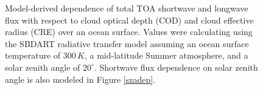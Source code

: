 \documentclass[12pt]{article}
\begin{document}
    \begin{figure}[h!]\label{flux-interp}
        \centering
        \begin{center}
        \end{center}
        \caption{Model-derived dependence of total TOA shortwave and longwave flux with respect to cloud optical depth (COD) and cloud effective radius (CRE) over an ocean surface. Values were calculating using the SBDART radiative transfer model assuming an ocean surface temperature of $300\,\si{K}$, a mid-latitude Summer atmosphere, and a solar zenith angle of $20^\circ$. Shortwave flux dependence on solar zenith angle is also modeled in Figure \ref{szadep}.}
    \end{figure}
\end{document}
